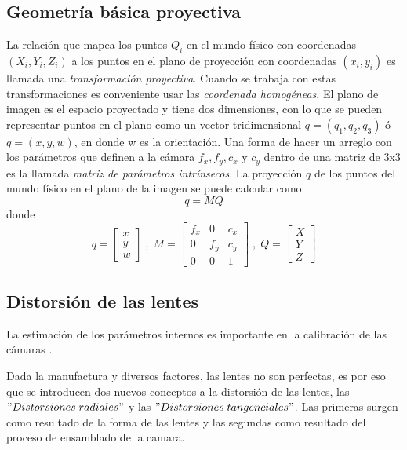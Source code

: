 \documentclass{book}
\begin{document}
\subsection{Geometría básica proyectiva}
La relación que mapea los puntos $Q_{i}$ en el mundo físico con coordenadas $(X_{i},Y_{i},Z_{i})$ a los puntos en el plano de proyección con coordenadas $(x_{i},y_{i})$ es llamada una \textit{transformación proyectiva}. Cuando se trabaja con estas transformaciones es conveniente usar las \textit{coordenada homogéneas}. El plano de imagen es el espacio proyectado y tiene dos dimensiones, con lo que se pueden representar puntos en el plano como un vector tridimensional $q=(q_{1},q_{2},q_{3})$ ó $q=(x, y, w)$, en donde w es la orientación. Una forma de hacer un arreglo con los parámetros que definen a la cámara $f_{x},f_{y},c_{x}$ y $c_{y}$ dentro de una matriz de 3x3 es la llamada \textit{matriz de parámetros intrínsecos}. La proyección $q$ de los puntos del mundo físico en el plano de la imagen se puede calcular como: 
\[q=MQ\]
donde
\[q=
\begin{bmatrix}
x\\ 
y\\
w 
\end{bmatrix}\;,\;M=
\begin{bmatrix}
f_{x} & 0 & c_{x}\\ 
0     &f_{y}&c_{y} \\
0     & 0 & 1
\end{bmatrix}\;,\;Q=
\begin{bmatrix}
X\\
Y\\
Z
\end{bmatrix}
\]
\subsection{Distorsión de las lentes}
La estimación de los parámetros internos es importante en la calibración de las cámaras \cite{weng1992camera}.


Dada la manufactura y diversos factores, las lentes no son perfectas, es por eso que se introducen dos nuevos conceptos a la distorsión de las lentes, las $"Distorsiones\;radiales"$ y las $"Distorsiones\;tangenciales"$. Las primeras surgen como resultado de la forma de las lentes y las segundas como resultado del proceso de ensamblado de la camara.

%


\end{document}
